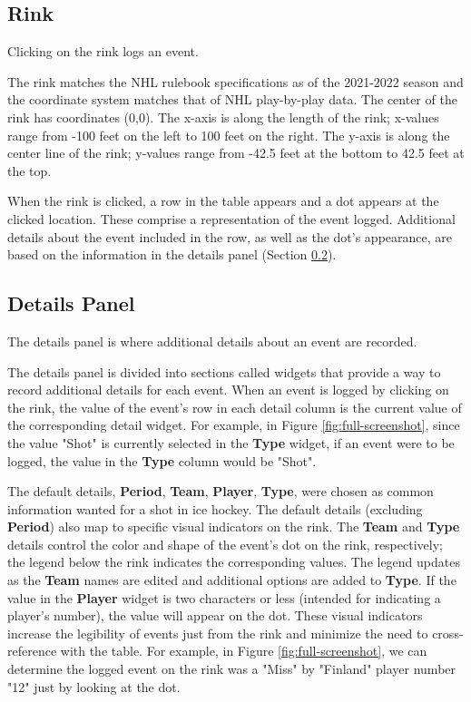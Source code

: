 \documentclass[letterpaper]{article}
\begin{document}
\subsection{Rink}\label{rink}
Clicking on the rink logs an event.

The rink matches the NHL rulebook specifications as of the 2021-2022 season \cite{nhlrulebook} and the coordinate system matches that of NHL play-by-play data. The center of the rink has coordinates (0,0). The x-axis is along the length of the rink; x-values range from -100 feet on the left to 100 feet on the right. The y-axis is along the center line of the rink; y-values range from -42.5 feet at the bottom to 42.5 feet at the top.

When the rink is clicked, a row in the table appears and a dot appears at the clicked location. These comprise a representation of the event logged. Additional details about the event included in the row, as well as the dot's appearance, are based on the information in the details panel (Section \ref{sidepanel}).

\subsection{Details Panel}\label{sidepanel}
The details panel is where additional details about an event are recorded. 

The details panel is divided into sections called widgets that provide a way to record additional details for each event. When an event is logged by clicking on the rink, the value of the event's row in each detail column is the current value of the corresponding detail widget. For example, in Figure \ref{fig:full-screenshot}, since the value "Shot" is currently selected in the \textbf{Type} widget, if an event were to be logged, the value in the \textbf{Type} column would be "Shot".

The default details, \textbf{Period}, \textbf{Team}, \textbf{Player}, \textbf{Type}, were chosen as common information wanted for a shot in ice hockey. The default details (excluding \textbf{Period}) also map to specific visual indicators on the rink. The \textbf{Team} and \textbf{Type} details control the color and shape of the event's dot on the rink, respectively; the legend below the rink indicates the corresponding values. The legend updates as the \textbf{Team} names are edited and additional options are added to \textbf{Type}. If the value in the \textbf{Player} widget is two characters or less (intended for indicating a player's number), the value will appear on the dot. These visual indicators increase the legibility of events just from the rink and minimize the need to cross-reference with the table. For example, in Figure \ref{fig:full-screenshot}, we can determine the logged event on the rink was a "Miss" by "Finland" player number "12" just by looking at the dot.
\end{document}
